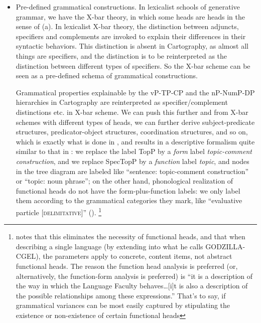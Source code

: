 \documentclass[UTF8, a4paper, oneside, scheme=plain, 12pt]{ctexrep}
\newcommand*{\term}[1]{\emph{#1}}
\newcommand*{\category}[1]{\textsc{#1}}
\begin{document}
{\begin{itemize}
    \item[(c)] Pre-defined grammatical constructions.
    In lexicalist schools of generative grammar,
    we have the X-bar theory, in which some heads are heads in the sense of (a).
    In lexicalist X-bar theory, the distinction between adjuncts, specifiers and complements
    are invoked to explain their differences in their syntactic behaviors.
    This distinction is absent in Cartography,
    as almost all things are specifiers, and the distinction is to be reinterpreted
    as the distinction between different types of specifiers.
    So the X-bar scheme can be seen as a pre-defined schema of grammatical constructions.
    
    Grammatical properties explainable by the vP-TP-CP and the nP-NumP-DP hierarchies in Cartography 
    are reinterpreted as specifier/complement distinctions etc. in X-bar scheme.
    We can push this further and from X-bar schemes with different types of heads,
    we can further derive 
    subject-predicate structures, predicator-object structures, coordination structures, and so on,
    which is exactly what is done in \citet{deng2010formal},
    and results in a descriptive formalism quite similar to that in \citet{cgel}:
    we replace the label TopP by a \term{form} label \term{topic-comment construction},
    and we replace SpecTopP by a \term{function} label \term{topic},
    and nodes in the tree diagram are labeled like ``sentence: topic-comment construction''
    or ``topic: noun phrase'';
    on the other hand, phonological realization of functional heads
    do not have the form-plus-function labels:
    we only label them according to the grammatical categories they mark,
    like ``evaluative particle [\category{delimitative}]'' ().%
    \footnote{
        \citet{culicover2004cambridge} notes that this eliminates the necessity of functional heads,
        and that when describing a single language (by extending \citet{cgel} into what he calls GODZILLA-CGEL),
        the parameters apply to concrete, content items, not abstract functional heads.
        The reason the function head analysis is preferred (or, alternatively, the function-form analysis is preferred) is 
        ``it is a description of the way in which the Language Faculty behaves\dots [i]t is also a description of the possible relationships among these expressions.''
        That's to say, if grammatical variances can be most easily captured by
        stipulating the existence or non-existence of certain functional heads
}
\end{itemize}}
\end{document}
